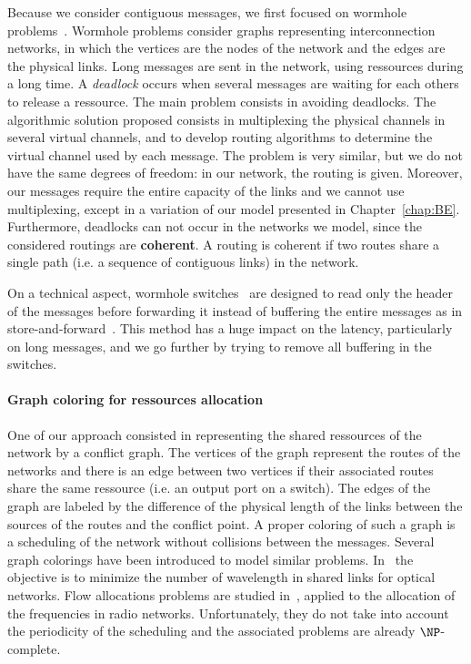 Because we consider contiguous messages, we first focused on wormhole problems~\cite{ni1993survey,cole1996benefit}. Wormhole problems consider graphs representing interconnection networks, in which the vertices are the nodes of the network and the edges are the physical links. Long messages are sent in the network, using ressources during a long time. A \emph{deadlock} occurs when several messages are waiting for each others to release a ressource. The main problem consists in avoiding deadlocks. The algorithmic solution proposed consists in multiplexing the physical channels in several virtual channels, and to develop routing algorithms to determine the virtual channel used by each message. 
The problem is very similar, but we do not have the same degrees of freedom: in our network, the routing  is given. Moreover, our messages require the entire capacity of the links and we cannot use multiplexing, except in a variation of our model presented in Chapter~\ref{chap:BE}. Furthermore, deadlocks can not occur in the networks we model, since the considered routings are \textbf{coherent}\cite{Schwiebert1996ANA}. A routing is coherent if two routes share a single path (i.e. a sequence of contiguous links) in the network.

On a technical aspect, wormhole switches~\cite{cole1996benefit} are designed to read only the header of the messages before forwarding it instead of buffering the entire messages as in store-and-forward~\cite{tindell1992store}. This method has a huge impact on the latency, particularly on long messages, and we go further by trying to remove all buffering in the switches.


\paragraph{Graph coloring for ressources allocation}

One of our approach consisted in representing the shared ressources of the network by a conflict graph. The vertices of the graph represent the routes of the networks and there is an edge between two vertices if their associated routes share the same ressource (i.e. an output port on a switch). The edges of the graph are labeled by the difference of the physical length of the links between the sources of the routes and the conflict point. A proper coloring of such a graph is a scheduling of the network without collisions between the messages. Several graph colorings have been introduced to model similar problems. In~\cite{erlebach2001complexity} the objective is to minimize the number of wavelength in shared links for optical networks. Flow allocations problems are studied in~\cite{borndorfer1998frequency}, applied to the allocation of the frequencies in radio networks. Unfortunately, they do not take into account the periodicity of the scheduling and the associated problems are already $\NP$-complete. 

